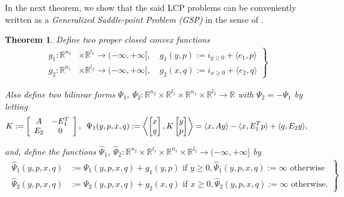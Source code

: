\documentclass{article} %
\newtheorem{theorem}{Theorem} \newtheorem{lemma}[theorem]{Lemma}
\begin{document}
In the next theorem, we show that the said LCP problems can be
conveniently written as a \textit{Generalized Saddle-point Problem
  (GSP)} in the sense of \cite{he2013accelerating}.
\begin{theorem}
Define two proper closed convex functions
  \begin{eqnarray}
    \left.
    \begin{aligned}
      g_1: \mathbb{R}^{n_2} &\times \mathbb{R}^{l_1} \rightarrow
      (-\infty, +\infty], \hspace{1em} g_1(y, p) :=
        i_{y \ge 0} + \langle e_1,p\rangle\\
        g_2: \mathbb{R}^{n_1} &\times \mathbb{R}^{l_2} \rightarrow
        (-\infty, +\infty],\hspace{1em} g_2(x, q) :=
          i_{x \ge 0} + \langle e_2, q\rangle
    \end{aligned}
    \right\}
    \label{eq:things}
  \end{eqnarray}

Also define two bilinear forms $\Psi_1$, $\Psi_2: \mathbb{R}^{n_2}
\times \mathbb{R}^{l_1} \times \mathbb{R}^{n_1} \times
\mathbb{R}^{l_2} \rightarrow \mathbb{R}$ with $\Psi_2 = -\Psi_1$ by letting
  \begin{equation}
      K :=
      \left[
        \begin{array}{cc}
          A & -E_1^T \\
          E_2 & 0
        \end{array}
        \right],\hspace{.5em}
    \Psi_1(y, p, x, q)
    := \left\langle \begin{bmatrix}x\\q\end{bmatrix},
      K\begin{bmatrix}y\\p\end{bmatrix}\right\rangle = \langle x,
      Ay\rangle -\langle x, E_1^Tp\rangle + \langle q, E_2y\rangle,
\end{equation}

and, define the functions $\hat{\Psi}_1$, $\hat{\Psi}_2:
\mathbb{R}^{n_2} \times \mathbb{R}^{l_1} \times \mathbb{R}^{n_1}
\times \mathbb{R}^{l_2} \rightarrow (-\infty, +\infty]$ by
\begin{eqnarray}
  \left.
  \begin{aligned}
    \hat{\Psi}_1(y, p, x, q) &:=
    \Psi_1(y, p, x, q)+ g_1(y, p) \text{ if }y \ge 0, \hat{\Psi}_1(y,
    p, x, q) := \infty \text{ otherwise}\\
    \hat{\Psi}_2(y, p, x, q) &:= \Psi_2(y, p, x, q)+ g_2(x, q) \text{ if
    }x \ge 0, \hat{\Psi}_2(y,p, x, q) := \infty \text{ otherwise}.
  \end{aligned}
  \right\}
\end{eqnarray}


\end{theorem}
\end{document}
